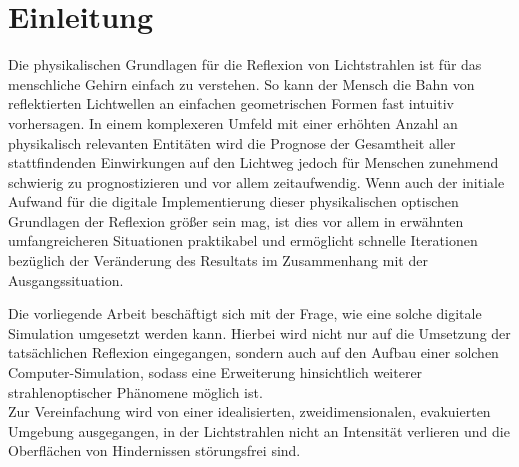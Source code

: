 \chapter{Einleitung}
Die physikalischen Grundlagen für die Reflexion von Lichtstrahlen ist für das menschliche Gehirn einfach zu verstehen. 
So kann der Mensch die Bahn von reflektierten Lichtwellen an einfachen geometrischen Formen fast intuitiv vorhersagen. 
In einem komplexeren Umfeld mit einer erhöhten Anzahl an physikalisch relevanten Entitäten wird die Prognose 
der Gesamtheit aller stattfindenden Einwirkungen auf den Lichtweg jedoch für Menschen zunehmend schwierig 
zu prognostizieren und vor allem zeitaufwendig.
Wenn auch der initiale Aufwand für die digitale Implementierung dieser physikalischen optischen Grundlagen der Reflexion größer sein mag, 
ist dies vor allem in erwähnten umfangreicheren Situationen praktikabel und ermöglicht schnelle Iterationen bezüglich der Veränderung 
des Resultats im Zusammenhang mit der Ausgangssituation. 

Die vorliegende Arbeit beschäftigt sich mit der Frage, wie eine solche digitale Simulation umgesetzt werden kann. 
Hierbei wird nicht nur auf die Umsetzung der tatsächlichen Reflexion eingegangen, sondern auch auf den Aufbau einer solchen Computer-Simulation, 
sodass eine Erweiterung hinsichtlich weiterer strahlenoptischer Phänomene möglich ist. \\ 
Zur Vereinfachung wird von einer idealisierten, zweidimensionalen, evakuierten Umgebung ausgegangen, in der Lichtstrahlen nicht an Intensität verlieren
und die Oberflächen von Hindernissen störungsfrei sind.